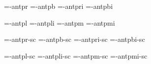 
\ifx\sizespec\undefined \def\sizespec{}\fi
\ifx\font\corkencoded {}\else {}\fi


\ifx\dgsize\undefined {}\fi

\font\tenrm=\tmp-antpr\dgsize  \space\sizespec
\font\tenbf=\tmp-antpb\dgsize  \space\sizespec
\font\tenit=\tmp-antpri\dgsize \space\sizespec
\font\tenbi=\tmp-antpbi\dgsize \space\sizespec

\font\tenlr=\tmp-antpl\dgsize  \space\sizespec  \def\lr{\tenlr}
\font\tenli=\tmp-antpli\dgsize \space\sizespec  \def\li{\tenli}
\font\tenmr=\tmp-antpm\dgsize  \space\sizespec  \def\mr{\tenmr}
\font\tenmi=\tmp-antpmi\dgsize \space\sizespec  \def\mi{\tenmi}

\font\tenrmc=\tmp-antpr\dgsize-sc  \sizespec
\font\tenbfc=\tmp-antpb\dgsize-sc  \sizespec
\font\tenitc=\tmp-antpri\dgsize-sc \sizespec
\font\tenbic=\tmp-antpbi\dgsize-sc \sizespec

\font\tenlrc=\tmp-antpl\dgsize-sc  \sizespec 
\font\tenlic=\tmp-antpli\dgsize-sc \sizespec
\font\tenmrc=\tmp-antpm\dgsize-sc  \sizespec
\font\tenmic=\tmp-antpmi\dgsize-sc \sizespec

\tenrm


\def\caps#1{{\escapechar=-1 \expandafter}%
  \expandafter\csname\expandafter\tenonlytext\string#1c\endcsname}
\def\tenonlytext{ten}

\ifx\regfont\undefined \else
  \regfont\tenrm  \regfont\tenit
  \regfont\tenbf  \regfont\tenbi 
  \regfont\tenlr  \regfont\tenli
  \regfont\tenmr  \regfont\tenmi
  \regfont\tenrmc \regfont\tenitc
  \regfont\tenbfc \regfont\tenbic
  \regfont\tenlrc \regfont\tenlic
  \regfont\tenmrc \regfont\tenmic
\fi

\ifx\normalTXmath\undefined  \else\normalTXmath \fi

\ifx\font\corkencoded \else  \fi

